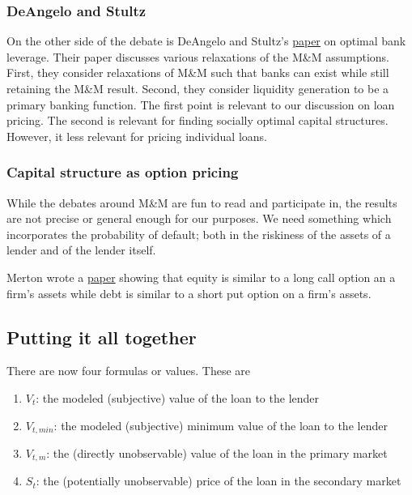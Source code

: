 \documentclass{article}
\theoremstyle{definition}
\begin{document}
\subsubsection{DeAngelo and Stultz}

On the other side of the debate is DeAngelo and Stultz's \href{https://fic.wharton.upenn.edu/wp-content/uploads/2016/11/13-20.pdf}{paper} on optimal bank leverage.  Their paper discusses various relaxations of the M\&M assumptions.  First, they consider relaxations of M\&M such that banks can exist while still retaining the M\&M result.  Second, they consider liquidity generation to be a primary banking function.  The first point is relevant to our discussion on loan pricing.  The second is relevant for finding socially optimal capital structures.  However, it less relevant for pricing individual loans.


\subsubsection{Capital structure as option pricing}

While the debates around M\&M are fun to read and participate in, the results are not precise or general enough for our purposes.  We need something which incorporates the probability of default; both in the riskiness of the assets of a lender and of the lender itself.  

Merton wrote a \href{http://www.people.hbs.edu/rmerton/Pricing%20of%20corporate%20debt.pdf}{paper} showing that equity is similar to a long call option an a firm's assets while debt is similar to a short put option on a firm's assets.  


\subsection{Putting it all together}


There are now four formulas or values.  These are

\begin{enumerate}
	\item \(V_t\): the modeled (subjective) value of the loan to the lender
	\item \(V_{t, min}\): the modeled (subjective) minimum value of the loan to the lender
	\item \(V_{t, m}\): the (directly unobservable) value of the loan in the primary market
	\item \(S_t\): the (potentially unobservable) price of the loan in the secondary market
	
\end{enumerate}
\end{document}
